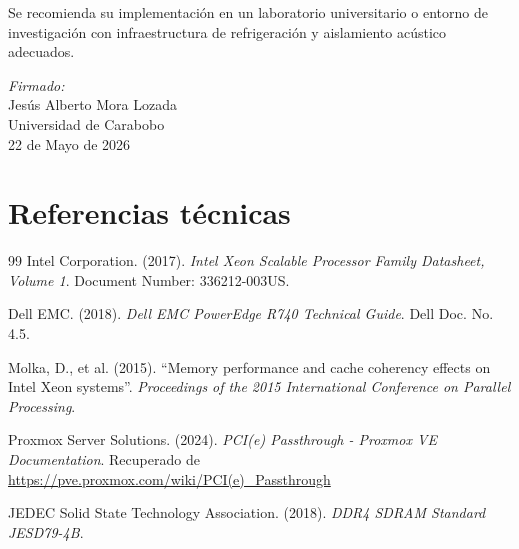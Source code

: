 \documentclass[12pt, letterpaper]{article}
\newcommand{\authorname}{Jesús Alberto Mora Lozada}
\newcommand{\institucion}{Universidad de Carabobo}
\begin{document}
Se recomienda su implementación en un laboratorio universitario o entorno de investigación con infraestructura de refrigeración y aislamiento acústico adecuados.

\vspace{1cm}

\begin{flushright}
\textit{Firmado:} \\
\authorname \\
\institucion \\
22 de Mayo de 2026
\end{flushright}

\newpage
\section*{Referencias técnicas}

\begin{thebibliography}{99}
     Intel Corporation. (2017). \textit{Intel Xeon Scalable Processor Family Datasheet, Volume 1}. Document Number: 336212-003US.
    
     Dell EMC. (2018). \textit{Dell EMC PowerEdge R740 Technical Guide}. Dell Doc. No. 4.5.
    
     Molka, D., et al. (2015). ``Memory performance and cache coherency effects on Intel Xeon systems''. \textit{Proceedings of the 2015 International Conference on Parallel Processing}.
    
     Proxmox Server Solutions. (2024). \textit{PCI(e) Passthrough - Proxmox VE Documentation}. Recuperado de \url{https://pve.proxmox.com/wiki/PCI(e)_Passthrough}
    
     JEDEC Solid State Technology Association. (2018). \textit{DDR4 SDRAM Standard JESD79-4B}.
\end{thebibliography}
\end{document}
